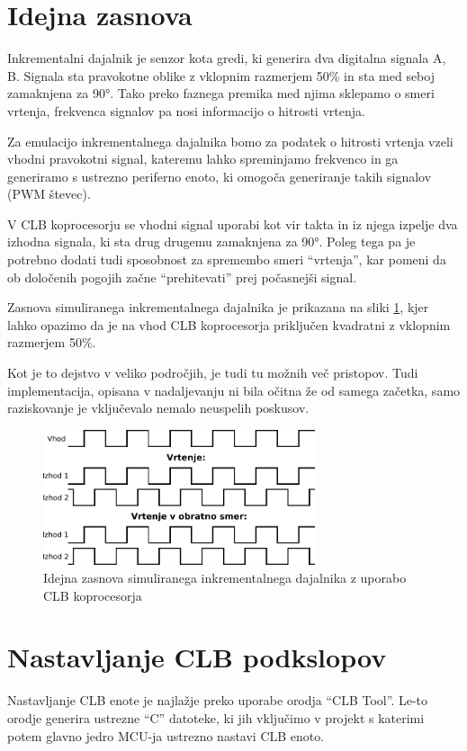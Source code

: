 \documentclass[a4paper]{article}
\begin{document}
\begin{sloppypar}
\section{Idejna zasnova}
Inkrementalni dajalnik je senzor kota gredi, ki generira dva digitalna signala
A, B.  Signala sta pravokotne oblike z vklopnim razmerjem 50\% in sta med seboj
zamaknjena za 90°. Tako preko faznega premika med njima sklepamo o smeri
vrtenja, frekvenca signalov pa nosi informacijo o hitrosti vrtenja.

Za emulacijo inkrementalnega dajalnika bomo za podatek o hitrosti vrtenja
vzeli vhodni pravokotni signal, kateremu lahko spreminjamo frekvenco in ga
generiramo s ustrezno periferno enoto, ki omogoča generiranje takih signalov
(PWM števec).

V CLB koprocesorju se vhodni signal uporabi kot vir takta in iz njega izpelje
dva izhodna signala, ki sta drug drugemu zamaknjena za 90°. Poleg
tega pa je potrebno dodati tudi sposobnost za spremembo smeri ``vrtenja'', kar
pomeni da ob določenih pogojih začne ``prehitevati'' prej počasnejši signal.

Zasnova simuliranega inkrementalnega dajalnika je prikazana na sliki
\ref{fig:enkoder_zasnova}, kjer lahko opazimo da je na vhod CLB koprocesorja
priključen kvadratni z vklopnim razmerjem 50\%.

Kot je to dejstvo v veliko področjih, je tudi tu možnih več
pristopov. Tudi implementacija, opisana v nadaljevanju ni bila očitna že od
samega začetka, samo raziskovanje je vključevalo nemalo neuspelih poskusov.

\begin{figure}[htb]
    \centerline{\includegraphics[width=8cm]{enkoder_zasnova}}
    \caption{Idejna zasnova simuliranega inkrementalnega dajalnika z uporabo
             CLB koprocesorja}
    \label{fig:enkoder_zasnova} 
\end{figure} 


\section{Nastavljanje CLB podkslopov}\label{sec:nastavitve_podsklopov}
Nastavljanje CLB enote je najlažje preko uporabe orodja ``CLB Tool''. Le-to
orodje generira ustrezne ``C'' datoteke, ki jih vključimo v projekt s katerimi
potem glavno jedro MCU-ja ustrezno nastavi CLB enoto. 


\end{sloppypar}
\end{document}
